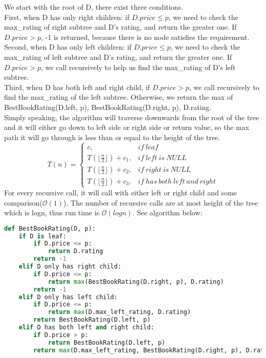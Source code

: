 \documentclass[10pt]{article}
\begin{document}
\begin{enumerate}
We start with the root of D, there exist three conditions.\\
First, when D has only right children: if $D.price \leq p$, we need to check the max\_rating of right subtree and D's rating, and return the greater one. If $D.price > p$, -1 is returned, because there is no node satisfies the requirement.\\Second, when D has only left children: if $D.price \leq p$, we need to check the max\_rating of left subtree and D's rating, and return the greater one. If $D.price > p$, we call recursively to help us find the max\_rating of D's left subtree.\\Third, when D has both left and right child, if $D.price > p$, we call recursively to find the max\_rating of the left subtree. Otherwise, we return the max of BestBookRating(D.left, p), BestBookRating(D.right, p), D.rating.\\
Simply speaking, the algorithm will traverse downwards from the root of the tree and it will either go down to left side or right side or return value, so the max path it will go through is less than or equal to the height of the tree.\\
\begin{equation*}
  T(n)=\begin{cases}
    c, &if\ leaf\\
    T( \lfloor\frac{n}{2}\rfloor) + c_1, &if\ left\ is\ NULL\\
    T(\lfloor\frac{n}{2}\rfloor) + c_2, &if\ right\ is\ NULL\\
    T(\lfloor\frac{n}{2}\rfloor) + c_3, &if\ has\ both\ left\ and\ right
  \end{cases}
\end{equation*}
For every recursive call, it will call with either left or right child and some comparison($\mathcal{O}(1)$). The number of recursive calls are at most height of the tree which is logn, thus run time is $\mathcal{O}(logn)$. See algorithm below:
\begin{lstlisting}[language=Python]
def BestBookRating(D, p):
	if D is leaf:
		if D.price <= p:
			return D.rating
		return -1
	elif D only has right child:
		if D.price <= p:
			return max(BestBookRating(D.right, p), D.rating)
		return -1
	elif D only has left child:
		if D.price <= p:
			return max(D.max_left_rating, D.rating)
		return BestBookRating(D.left, p)
	elif D has both left and right child:
		if D.price > p:
			return BestBookRating(D.left, p)
		return max(D.max_left_rating, BestBookRating(D.right, p), D.rating)
\end{lstlisting}


\end{enumerate}
\end{document}
